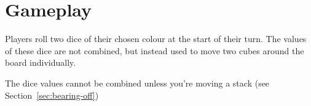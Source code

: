 \section{Gameplay}
Players roll two dice of their chosen colour at the start of their turn.
The values of these dice are not combined, but instead used to move two cubes around the board individually. 

\note The dice values cannot be combined unless you're moving a stack (see Section~\ref{sec:bearing-off})






